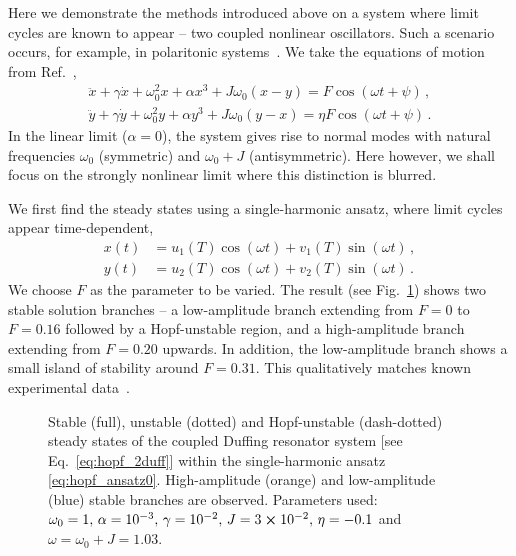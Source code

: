 Here we demonstrate the methods introduced above on a system where limit cycles are known to appear -- two coupled nonlinear oscillators. Such a scenario occurs, for example, in polaritonic systems~\cite{Zambon_2020}. We take the equations of motion from Ref.~\cite{Zambon_2020},
\begin{equation} \label{eq:hopf_2duff} 
\begin{gathered}
\ddot{x} + \gamma \dot{x} + \omega_0^2 x + \alpha x^3 + J \omega_0 (x-y) = F \cos(\omega t + \psi) \,, \\
\ddot{y} + \gamma \dot{y} + \omega_0^2 y + \alpha y^3 + J \omega_0 (y-x) = \eta F \cos(\omega t + \psi) \,. 
\end{gathered}
\end{equation}
In the linear limit ($\alpha = 0$), the system gives rise to normal modes with natural frequencies $\omega_0$ (symmetric) and $\omega_0 + J $ (antisymmetric). Here however, we shall focus on the strongly nonlinear limit where this distinction is blurred. 
	
We first find the steady states using a single-harmonic ansatz, where limit cycles appear time-dependent,
\begin{equation}
\begin{aligned} \label{eq:hopf_ansatz0}
x(t) &= u_1(T) \cos(\omega t) + v_1(T) \sin(\omega t) \,,  \\y(t) &= u_2(T) \cos(\omega t ) + v_2(T) \sin(\omega t)\,.
\end{aligned}
\end{equation}
We choose $F$ as the parameter to be varied. The result (see Fig.~\ref{fig:hopf_ansatz0}) shows two stable solution branches -- a low-amplitude branch extending from $F = 0$ to $F=0.16$ followed by a Hopf-unstable region, and a high-amplitude branch extending from $F=0.20$ upwards. In addition, the low-amplitude branch shows a small island of stability around $F=0.31$. This qualitatively matches known experimental data~\cite{Zambon_2020}.
%
\begin{figure} [h!]
	\centering
	
	\caption{Stable (full), unstable (dotted) and Hopf-unstable (dash-dotted) steady states of the coupled Duffing resonator system [see Eq.~\eqref{eq:hopf_2duff}] within the single-harmonic ansatz \eqref{eq:hopf_ansatz0}. High-amplitude (orange) and low-amplitude (blue) stable branches are observed. Parameters used: $\omega_0 = 1, \, \alpha= 10^{-3}, \, \gamma=10^{-2}, \, J = 3\cross10^{-2}, \, \eta = -0.1$ and $ \omega = \omega_0 + J = 1.03$.}
	\label{fig:hopf_ansatz0}
\end{figure}

